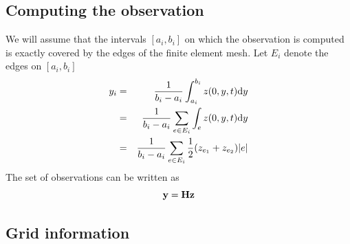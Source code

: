 \documentclass[12pt]{article}
\begin{document}
\subsection{Computing the observation}
We will assume that the intervals $[a_i, b_i]$ on which the observation is computed is exactly covered by the edges of the finite element mesh. Let $E_i$ denote the edges on $[a_i,b_i]$
\begin{eqnarray*}
y_i &=& \frac{1}{b_i-a_i} \int_{a_i}^{b_i} z(0,y,t) \textrm{d} y \\
&=& \frac{1}{b_i-a_i} \sum_{e \in E_i} \int_e z(0,y,t) \textrm{d} y \\
&=& \frac{1}{b_i-a_i} \sum_{e \in E_i} \frac{1}{2} (z_{e_1} + z_{e_2}) |e|
\end{eqnarray*}
The set of observations can be written as
\[
{\mathbf y} = {\mathbf H} {\mathbf z}
\]
\subsection{Grid information}

\end{document}
